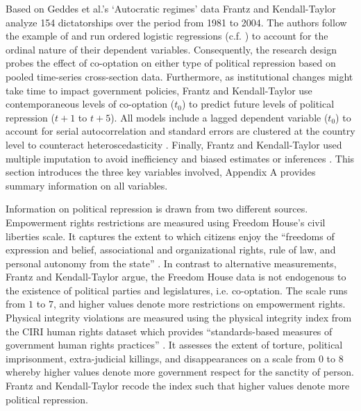 Based on Geddes et al.'s \citeyearpar{Geddes.2014}
`Autocratic regimes' data Frantz and Kendall-Taylor
analyze 154 dictatorships over the period from 1981 to 2004.
The authors follow the example of \citet{Vreeland.2008} and
run ordered logistic regressions 
(c.f. \cite{Fox.2008,Fox.2011,Ward.08062014}) to account for
the ordinal nature of their dependent variables. 
Consequently, the research design probes the effect of 
co-optation on either type of political repression based on 
pooled time-series cross-section data. Furthermore, as 
institutional changes might take time to impact government 
policies, Frantz and Kendall-Taylor use contemporaneous 
levels of co-optation ($t_0$) to predict future levels of 
political repression ($t+1$ to $t+5$). All models include a
lagged dependent variable ($t_0$) to account for serial 
autocorrelation and standard errors are clustered at 
the country level to counteract heteroscedasticity 
\citep{Beck.1995}. Finally, Frantz and Kendall-Taylor used
multiple imputation to avoid inefficiency and biased 
estimates or inferences 
\citep{King.2001b,Honaker.2010,Honaker.2011}. This section
introduces the three key variables involved, Appendix A 
provides summary information on all variables.

Information on political repression is drawn from two 
different sources. Empowerment rights restrictions are 
measured using Freedom House's civil liberties scale. It 
captures the extent to which citizens enjoy the ``freedoms 
of expression and belief, associational and organizational 
rights, rule of law, and personal autonomy from the state'' 
\citep{FreedomHouse.2010}. In contrast to alternative 
measurements, Frantz and Kendall-Taylor argue, the Freedom 
House data is not endogenous to the existence of political 
parties and legislatures, i.e. co-optation. The scale runs 
from $1$ to $7$, and higher values denote more restrictions 
on empowerment rights. Physical integrity violations are 
measured using the physical integrity index from the CIRI 
human rights dataset which provides ``standards-based 
measures of government human rights practices'' 
\citep[402]{Cingranelli.2010b}. It assesses the extent of 
torture, political imprisonment, extra-judicial killings, 
and disappearances on a scale from $0$ to $8$ whereby higher
values denote more government respect for the sanctity of 
person. Frantz and Kendall-Taylor recode the index such that
higher values denote more political repression.

